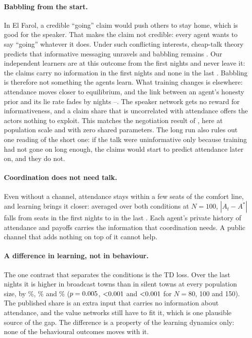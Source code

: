 \documentclass[11pt]{article}
\begin{document}
\paragraph{Babbling from the start.}
In El Farol, a credible ``going'' claim would push others to stay home, which is good for the speaker. That makes the claim not credible: every agent wants to say ``going'' whatever it does. Under such conflicting interests, cheap-talk theory predicts that informative messaging unravels and babbling remains \citep{crawford1982,farrell1996}. Our independent learners are at this outcome from the first nights and never leave it: the claims carry no information in the first \rnightsShort{} nights and none in the last \rnightsLate. Babbling is therefore not something the agents learn. What training changes is elsewhere: attendance moves closer to equilibrium, and the link between an agent's honesty prior and its lie rate fades by nights \rlateStart--\rnightsLong. The speaker network gets no reward for informativeness, and a claim share that is uncorrelated with attendance offers the actors nothing to exploit. This matches the negotiation result of \citet{cao2018}, here at population scale and with zero shared parameters. The long run also rules out one reading of the short one: if the talk were uninformative only because training had not gone on long enough, the claims would start to predict attendance later on, and they do not.

\paragraph{Coordination does not need talk.}
Even without a channel, attendance stays within a few seats of the comfort line, and learning brings it closer: averaged over both conditions at $N = 100$, $|A_t - A^*|$ falls from \rgapEarlyC{} seats in the first \rnightsShort{} nights to \rgapLateC{} in the last \rnightsLate. Each agent's private history of attendance and payoffs carries the information that coordination needs. A public channel that adds nothing on top of it cannot help.

\paragraph{A difference in learning, not in behaviour.}
The one contrast that separates the conditions is the TD loss. Over the last \rnightsLate{} nights it is higher in broadcast towns than in silent towns at every population size, by \rlossPctLXXX\%, \rlossPctC\% and \rlossPctCL\% ($p = 0.005$, $\rlossPC$ and $\rlossPCL$ for $N = 80$, 100 and 150). The published share is an extra input that carries no information about attendance, and the value networks still have to fit it, which is one plausible source of the gap. The difference is a property of the learning dynamics only: none of the behavioural outcomes moves with it.
\end{document}
